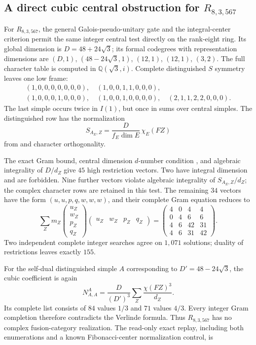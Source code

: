 \subsection{A direct cubic central obstruction for \texorpdfstring{$R_{8,3,567}$}{R8,3,567}}
\label{subsec:r567-centerless-verlinde}

For $R_{8,3,567}$, the general Galois-pseudo-unitary gate and the
integral-center criterion permit the same integer central test directly
on the rank-eight ring.  Its global dimension is $D=48+24\sqrt3$;
its formal codegrees with representation dimensions are
$(D,1)$, $(48-24\sqrt3,1)$, $(12,1)$, $(12,1)$, $(3,2)$.
The full character table is computed in $\mathbb Q(\sqrt3,i)$.
Complete distinguished $S$ symmetry leaves one low frame:
\[
\begin{gathered}
(1,0,0,0,0,0,0,0),\quad(1,0,0,1,1,0,0,0),\\
(1,0,0,0,1,0,0,0),\quad(1,0,0,1,0,0,0,0),\quad
(2,1,1,2,2,0,0,0).
\end{gathered}
\]
The last simple occurs twice in $I(1)$, but once in sums over central
simples. The distinguished row has the normalization
\[
 S_{A_E,Z}=\frac{D}{f_E\dim E}\,\chi_E(FZ)
\]
from \cite[equation~(39)]{DeshpandeCenter} and character orthogonality.

The exact Gram bound, central dimension $d$-number condition
\cite[Theorem~1.8]{OstrikCode}, and algebraic integrality of $D/d_Z$
\cite[Proposition~3.3]{ENO} give $45$ high restriction vectors.
Two have integral dimension and are forbidden.  Nine further vectors
violate algebraic integrality of $S_{A_E,Z}/d_Z$; the complex character
rows are retained in this test.  The remaining $34$ vectors have the
form $(u,u,p,q,w,w,w)$, and their complete Gram equation reduces to
\[
\sum_Z m_Z
\begin{pmatrix}u_Z\\w_Z\\p_Z\\q_Z\end{pmatrix}
\begin{pmatrix}u_Z&w_Z&p_Z&q_Z\end{pmatrix}
=
\begin{pmatrix}
4&0&4&4\\0&4&6&6\\4&6&42&31\\4&6&31&42
\end{pmatrix}.
\]
Two independent complete integer searches agree on $1{,}071$ solutions;
duality of restrictions leaves exactly $155$.

For the self-dual distinguished simple $A$ corresponding to
$D'=48-24\sqrt3$, the cubic coefficient is again
\[
 N_{A,A}^{A}=\frac{D}{(D')^3}\sum_Z\frac{\chi(FZ)^3}{d_Z}.
\]
Its complete list consists of $84$ values $1/3$ and $71$ values $4/3$.
Every integer Gram completion therefore contradicts the Verlinde
formula.  Thus $R_{8,3,567}$ has no complex fusion-category realization.
The read-only exact replay, including both enumerations and a known
Fibonacci-center normalization control, is
\begin{quote}\small{}\end{quote}
